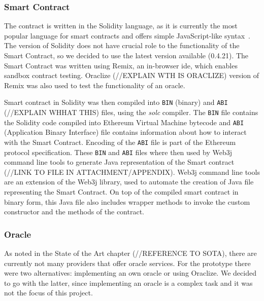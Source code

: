 \subsubsection{Smart Contract}
The contract is written in the Solidity language, as it is currently the most popular language for smart contracts and offers simple JavaScript-like syntax~\cite{Tikhomirov2018Ethereum:Perspectives}. The version of Solidity does not have crucial role to the functionality of the Smart Contract, so we decided to use the latest version available (0.4.21)\footnotemark. The Smart Contract was written using Remix, an in-browser \acrshort{ide}, which enables sandbox contract testing. Oraclize (//EXPLAIN WTH IS ORACLIZE) version of Remix was also used to test the functionality of an oracle.
% 

Smart contract in Solidity was then compiled into \texttt{BIN} (binary) and \texttt{ABI} (//EXPLAIN WHHAT THIS) files, using the \textit{solc} compiler. The \texttt{BIN} file contains the Solidity code compiled into Ethereum Virtual Machine bytecode and \texttt{ABI} (Application Binary Interface) file contains information about how to interact with the Smart Contract. Encoding of the \texttt{ABI} file is part of the Ethereum protocol specification\footnotemark. These \texttt{BIN} and \texttt{ABI} files where then used by Web3j command line tools to generate Java representation of the Smart contract (//LINK TO FILE IN ATTACHMENT/APPENDIX). Web3j command line tools are an extension of the Web3j library, used to automate the creation of Java file representing the Smart Contract. On top of the compiled smart contract in binary form, this Java file also includes wrapper methods to invoke the custom constructor and the methods of the contract.
% 

\subsubsection{Oracle}
As noted in the State of the Art chapter (//REFERENCE TO SOTA), there are currently not many providers that offer oracle services. For the prototype there were two alternatives: implementing an own oracle or using Oraclize. We decided to go with the latter, since implementing an oracle is a complex task and it was not the focus of this project.

